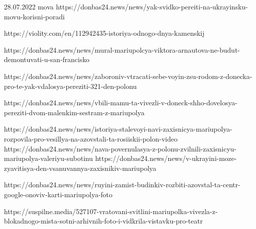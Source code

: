28.07.2022 mova
https://donbas24.news/news/yak-svidko-pereiti-na-ukrayinsku-movu-korisni-poradi

https://violity.com/en/112942435-istoriya-odnogo-dnya-kamenskij

https://donbas24.news/news/mural-mariupolcya-viktora-arnautova-ne-budut-demontuvati-u-san-francisko

https://donbas24.news/news/zaboroniv-vtracati-sebe-voyin-zsu-rodom-z-donecka-pro-te-yak-vdalosya-pereziti-321-den-polonu

https://donbas24.news/news/vbili-mamu-ta-vivezli-v-doneck-shho-dovelosya-pereziti-dvom-malenkim-sestram-z-mariupolya

https://donbas24.news/news/istoriya-stalevoyi-navi-zaxisnicya-mariupolya-rozpovila-pro-vesillya-na-azovstali-ta-rosiiskii-polon-video
https://donbas24.news/news/nava-povernulasya-z-polonu-zvilnili-zaxisnicyu-mariupolya-valeriyu-subotinu
https://donbas24.news/news/v-ukrayini-moze-zyavitisya-den-vsanuvannya-zaxisnikiv-mariupolya

https://donbas24.news/news/ruyini-zamist-budinkiv-rozbiti-azovstal-ta-centr-google-onoviv-karti-mariupolya-foto


https://suspilne.media/527107-vratovani-svitlini-mariupolka-vivezla-z-blokadnogo-mista-sotni-arhivnih-foto-i-vidkrila-vistavku-pro-teatr

